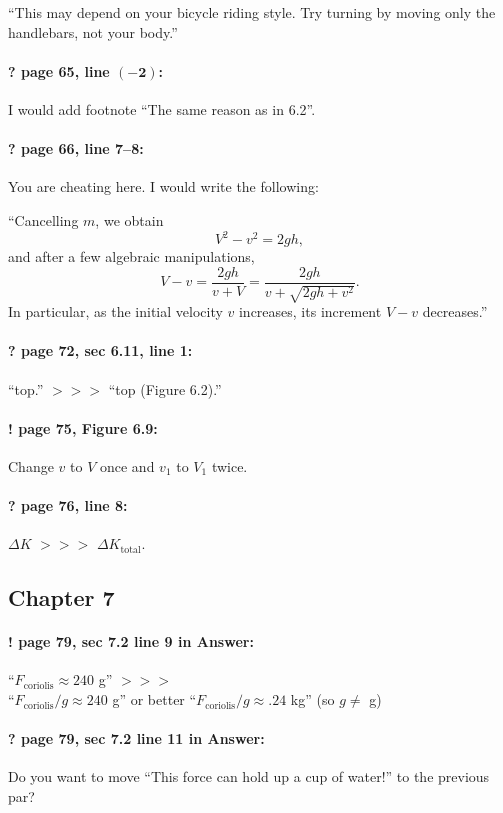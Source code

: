 \documentclass[twoside]{article}
\begin{document}
``This may depend on your bicycle riding style. Try turning by moving only the handlebars, not your body.''

\paragraph{? page 65, line $\bm{(-2)}$:} I would add footnote ``The same reason as in 6.2''.

\paragraph{? page 66, line 7--8:} You are cheating here. I would write the following:

``Cancelling $m$, we obtain
\[
V^2 - v^2 = 2gh,
\]
and after a few algebraic manipulations,
\[
V - v = \frac{2gh}{v+V} = \frac{2gh}{v+\sqrt{2gh+v^2}}.
\]
In particular, as the initial velocity $v$ increases, its increment $V - v$ decreases.''

\paragraph{? page 72, sec 6.11, line 1:} ``top.'' $>\!>\!>$  ``top (Figure 6.2).''

\paragraph{! page 75, Figure 6.9:} Change $v$ to $V$ once and $v_1$ to $V_1$ twice.

\paragraph{? page 76, line 8:} $\Delta K$ $>\!>\!>$ $\Delta K_{\mathrm{total}}$.

\subsection*{Chapter 7}

\paragraph{! page 79, sec 7.2 line 9 in Answer:}
``$F_{\mathrm{coriolis}}\approx 240$ g'' $>\!>\!>$
\\
``$F_{\mathrm{coriolis}}/g\approx 240$ g'' or better ``$F_{\mathrm{coriolis}}/g\approx .24$ kg'' (so $g\ne$ g)

\paragraph{? page 79, sec 7.2 line 11 in Answer:} Do you want to move ``This force can hold up a cup of water!'' to the previous par?
\end{document}
